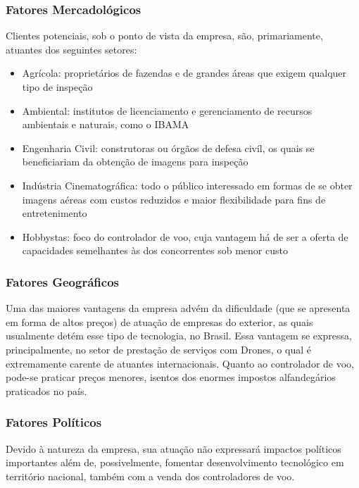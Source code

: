 \subsubsection*{Fatores Mercadológicos}

Clientes potenciais, sob o ponto de vista da empresa, são, primariamente, atuantes dos seguintes setores:

\begin{itemize}
	\item Agrícola: proprietários de fazendas e de grandes áreas que exigem qualquer tipo de inspeção
	\item Ambiental: institutos de licenciamento e gerenciamento de recursos ambientais e naturais, como o IBAMA
	\item Engenharia Civil: construtoras ou órgãos de defesa civíl, os quais se beneficiariam da obtenção de 
	imagens para inspeção
	\item Indústria Cinematográfica: todo o público interessado em formas de se obter imagens aéreas com custos reduzidos e 
	maior flexibilidade para fins de entretenimento
	\item Hobbystas: foco do controlador de voo, cuja vantagem há de ser a oferta de capacidades semelhantes às dos 
	concorrentes sob menor custo
\end{itemize}

\subsubsection*{Fatores Geográficos}

Uma das maiores vantagens da empresa advém da dificuldade (que se apresenta em forma de altos preços) 
de atuação de empresas do exterior, as quais usualmente detém esse tipo de tecnologia, no Brasil. Essa 
vantagem se expressa, principalmente, no setor de prestação de serviços com Drones, o qual é extremamente 
carente de atuantes internacionais. Quanto ao controlador de voo, pode-se praticar preços menores, isentos 
dos enormes impostos alfandegários praticados no país.

\subsubsection*{Fatores Políticos}

Devido à natureza da empresa, sua atuação não expressará impactos políticos importantes além de, 
possivelmente, fomentar desenvolvimento tecnológico em território nacional, também com a venda dos controladores de voo.


